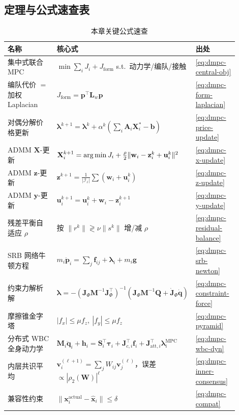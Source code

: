 \subsection*{定理与公式速查表}
\begin{table}[H]\centering\small
\caption{本章关键公式速查}
\label{tab:dmpc-formulas}
\begin{tabular}{p{0.30\linewidth}p{0.40\linewidth}p{0.20\linewidth}}
\toprule
名称 & 核心式 & 出处 \\
\midrule
集中式联合 MPC & $\min\sum_i J_i+J_{\text{form}}$ s.t.\ 动力学/编队/接触 & \cref{eq:dmpc-central-obj} \\
编队代价 $=$ 加权 Laplacian & $J_{\text{form}}=\mathbf{p}^\top \mathbf{L}_w\mathbf{p}$ & \cref{eq:dmpc-form-laplacian} \\
对偶分解价格更新 & $\boldsymbol{\lambda}^{k+1}=\boldsymbol{\lambda}^k+\alpha^k(\sum_i \mathbf{A}_i\mathbf{X}_i^*-\mathbf{b})$ & \cref{eq:dmpc-price-update} \\
ADMM $\mathbf{X}$-更新 & $\mathbf{X}_i^{k+1}=\operatorname*{arg\,min} J_i+\tfrac{\rho}{2}\|\mathbf{w}_i-\mathbf{z}_i^k+\mathbf{u}_i^k\|^2$ & \cref{eq:dmpc-x-update} \\
ADMM $\mathbf{z}$-更新 & $\mathbf{z}^{k+1}=\tfrac{1}{|\mathcal{I}_z|}\sum(\mathbf{w}_i+\mathbf{u}_i^k)$ & \cref{eq:dmpc-z-update} \\
ADMM $\mathbf{y}$-更新 & $\mathbf{u}_i^{k+1}=\mathbf{u}_i^k+\mathbf{w}_i-\mathbf{z}_i^{k+1}$ & \cref{eq:dmpc-y-update} \\
残差平衡自适应 $\rho$ & 按 $\|r^k\|\gtrless\nu\|s^k\|$ 增/减 $\rho$ & \cref{eq:dmpc-residual-balance} \\
SRB 网络牛顿方程 & $m_i\ddot{\mathbf{p}}_i=\sum_j\mathbf{f}_{ij}+\boldsymbol{\lambda}_i+m_i\mathbf{g}$ & \cref{eq:dmpc-srb-newton} \\
约束力解析解 & $\boldsymbol{\lambda}=-(\mathbf{J}_\Phi \mathbf{M}^{-1}\mathbf{J}_\Phi^\top)^{-1}(\mathbf{J}_\Phi \mathbf{M}^{-1}\mathbf{Q}+\dot{\mathbf{J}}_\Phi\dot{\mathbf{q}})$ & \cref{eq:dmpc-constraint-force} \\
摩擦锥金字塔 & $|f_x|\le\mu f_z,\ |f_y|\le\mu f_z$ & \cref{eq:dmpc-pyramid} \\
分布式 WBC 全身动力学 & $\mathbf{M}_i\ddot{\mathbf{q}}_i+\mathbf{h}_i=\mathbf{S}_i^\top\boldsymbol{\tau}_i+\mathbf{J}_{c,i}^\top\mathbf{f}_i+\mathbf{J}_{\text{att},i}^\top\boldsymbol{\lambda}_i^{\text{MPC}}$ & \cref{eq:dmpc-wbc-dyn} \\
内层共识平均 & $\mathbf{v}_i^{(\ell+1)}=\sum_j W_{ij}\mathbf{v}_j^{(\ell)}$，误差 $\propto|\rho_2(\mathbf{W})|^\ell$ & \cref{eq:dmpc-inner-consensus} \\
兼容性约束 & $\|\mathbf{x}_i^{\text{actual}}-\hat{\mathbf{x}}_i\|\le\delta$ & \cref{eq:dmpc-compat} \\
\bottomrule
\end{tabular}
\end{table}

